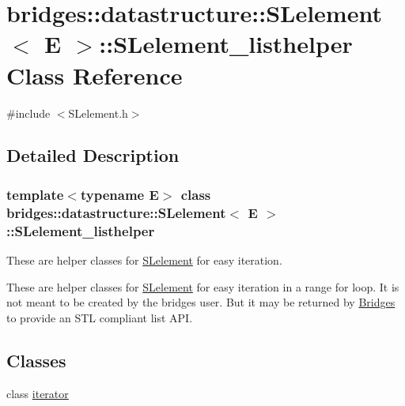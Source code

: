\hypertarget{classbridges_1_1datastructure_1_1_s_lelement_1_1_s_lelement__listhelper}{}\section{bridges\+:\+:datastructure\+:\+:S\+Lelement$<$ E $>$\+:\+:S\+Lelement\+\_\+listhelper Class Reference}
\label{classbridges_1_1datastructure_1_1_s_lelement_1_1_s_lelement__listhelper}


{\ttfamily \#include $<$S\+Lelement.\+h$>$}



\subsection{Detailed Description}
\subsubsection*{template$<$typename E$>$\newline
class bridges\+::datastructure\+::\+S\+Lelement$<$ E $>$\+::\+S\+Lelement\+\_\+listhelper}

These are helper classes for \hyperlink{classbridges_1_1datastructure_1_1_s_lelement}{S\+Lelement} for easy iteration. 

These are helper classes for \hyperlink{classbridges_1_1datastructure_1_1_s_lelement}{S\+Lelement} for easy iteration in a range for loop. It is not meant to be created by the bridges user. But it may be returned by \hyperlink{classbridges_1_1_bridges}{Bridges} to provide an S\+TL compliant list A\+PI. \subsection*{Classes}
\begin{DoxyCompactItemize}
\item 
class \hyperlink{classbridges_1_1datastructure_1_1_s_lelement_1_1_s_lelement__listhelper_1_1iterator}{iterator}
\end{DoxyCompactItemize}
